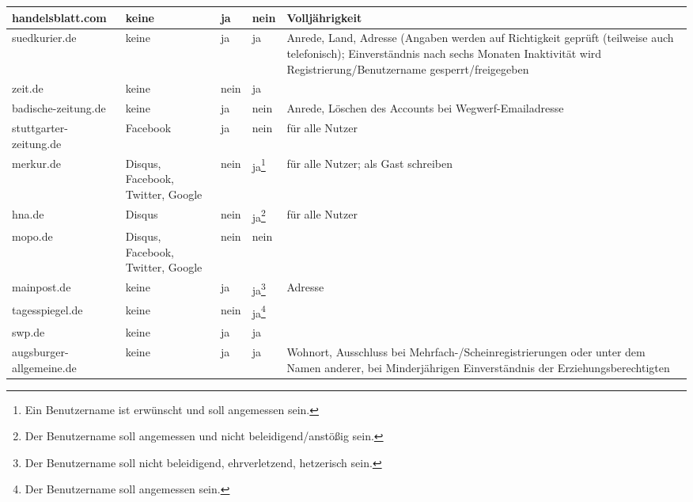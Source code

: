 \begin{landscape}
\begin{longtable}{lp{28mm}p{20mm}p{20mm}p{90mm}}
handelsblatt.com %
& keine
& ja
& nein
& Volljährigkeit
\\\midrule

suedkurier.de %
& keine
& ja
& ja
& Anrede, Land, Adresse (Angaben werden auf Richtigkeit geprüft (teilweise auch
  telefonisch); Einverständnis nach sechs Monaten Inaktivität wird
  Registrierung/Benutzername gesperrt/freigegeben
\\\midrule

zeit.de %
& keine
& nein
& ja
&
\\\midrule

badische-zeitung.de %
& keine
& ja
& nein
& Anrede, Löschen des Accounts bei Wegwerf-Emailadresse
\\\midrule

stuttgarter-zeitung.de %
& Facebook
& ja
& nein
&für alle Nutzer
\\\midrule

merkur.de %
& Disqus, Facebook, Twitter, Google
& nein
& ja\footnote{Ein Benutzername ist erwünscht und soll angemessen sein.}
& für alle Nutzer; als Gast schreiben
\\\midrule

hna.de %
& Disqus
& nein
& ja\footnote{Der Benutzername soll angemessen und nicht beleidigend/anstößig
  sein.}
&für alle Nutzer
\\\midrule

mopo.de %
& Disqus, Facebook, Twitter, Google
& nein
& nein
&
\\\midrule

mainpost.de %
& keine
& ja
& ja\footnote{Der Benutzername soll nicht beleidigend, ehrverletzend, hetzerisch
  sein.}
& Adresse
\\\midrule

tagesspiegel.de %
& keine
& nein
& ja\footnote{Der Benutzername soll angemessen sein.}
&
\\\midrule

swp.de %
& keine
& ja
& ja
&
\\\midrule

augsburger-allgemeine.de %
& keine
& ja
& ja
& Wohnort, Ausschluss bei Mehrfach-/Scheinregistrierungen oder unter dem Namen
  anderer, bei Minderjährigen Einverständnis der Erziehungsberechtigten

\end{longtable}
\end{landscape}


